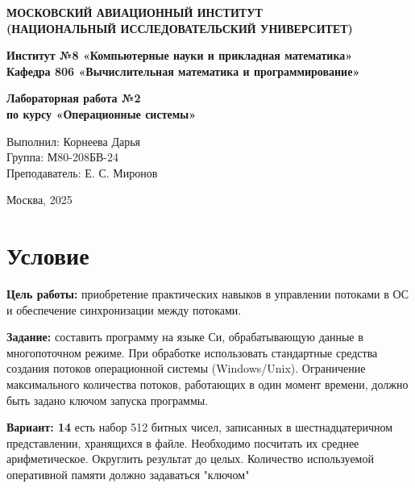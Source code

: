 \documentclass[12pt,a4paper]{article}
\begin{document}
\begin{titlepage}
\begin{center}
\textbf{МОСКОВСКИЙ АВИАЦИОННЫЙ ИНСТИТУТ} \\
\textbf{(НАЦИОНАЛЬНЫЙ ИССЛЕДОВАТЕЛЬСКИЙ УНИВЕРСИТЕТ)} \\

\vspace{1cm}

\textbf{Институт №8 «Компьютерные науки и прикладная математика»} \\
\textbf{Кафедра 806 «Вычислительная математика и программирование»} \\

\vspace{6cm}

\textbf{Лабораторная работа №2} \\
\textbf{по курсу «Операционные системы»} \\

\vspace{5cm}

\begin{flushright}
Выполнил: Корнеева Дарья \\
Группа: М80-208БВ-24 \\
Преподаватель: Е. С. Миронов \\
\end{flushright}

\vspace{5cm}

Москва, 2025

\end{center}
\end{titlepage}

\section*{Условие}
\textbf{Цель работы:} приобретение практических навыков в управлении потоками в ОС и обеспечение синхронизации между потоками.

\textbf{Задание:} составить программу на языке Си, обрабатывающую данные в многопоточном режиме. При обработке использовать стандартные средства создания потоков операционной системы (Windows/Unix). Ограничение максимального количества потоков, работающих в один момент времени, должно быть задано ключом запуска программы.

\textbf{Вариант: 14} есть набор 512 битных чисел, записанных в шестнадцатеричном представлении, хранящихся в файле. Необходимо посчитать их среднее арифметическое. Округлить результат до целых. Количество используемой оперативной памяти должно задаваться "ключом"
\end{document}
